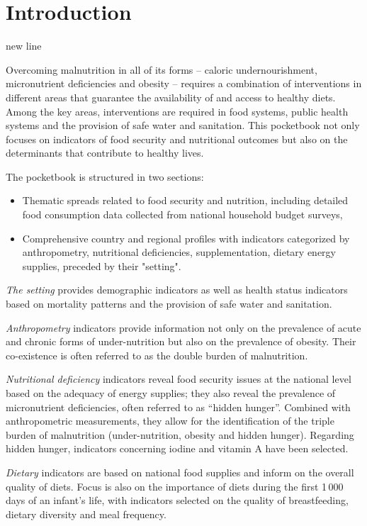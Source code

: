 \section{Introduction}

\bigskip
\bigskip

new line

Overcoming malnutrition in all of its forms – caloric undernourishment, micronutrient deficiencies and obesity – requires a combination of interventions in different areas that guarantee the availability of and access to healthy diets. Among the key areas, interventions are required in food systems, public health systems and the provision of safe water and sanitation. This pocketbook not only focuses on indicators of food security and nutritional outcomes but also on the determinants that contribute to healthy lives. 

The pocketbook is structured in two sections: 
\begin{itemize}
\item Thematic spreads related to food security and nutrition, including detailed food consumption data collected from national household budget surveys,
\item Comprehensive country and regional profiles with indicators categorized by anthropometry, nutritional deficiencies, supplementation, dietary energy supplies, preceded by their "setting".
\end{itemize}

\textit{The setting} provides demographic indicators as well as health status indicators based on mortality patterns and the provision of safe water and sanitation. 

\textit{Anthropometry} indicators provide information not only on the prevalence of acute and chronic forms of under-nutrition but also on the prevalence of obesity. Their co-existence is often referred to as the double burden of malnutrition. 

\textit{Nutritional deficiency} indicators reveal food security issues at the national level based on the adequacy of energy supplies; they also reveal the prevalence of micronutrient deficiencies, often referred to as “hidden hunger”. Combined with anthropometric measurements, they allow for the identification of the triple burden of malnutrition (under-nutrition, obesity and hidden hunger). Regarding hidden hunger, indicators concerning iodine and vitamin A have been selected.

\textit{Dietary} indicators are based on national food supplies and inform on the overall quality of diets. Focus is also on the importance of diets during the first 1\,000 days of an infant’s life, with indicators selected on the quality of breastfeeding, dietary diversity and meal frequency. 

